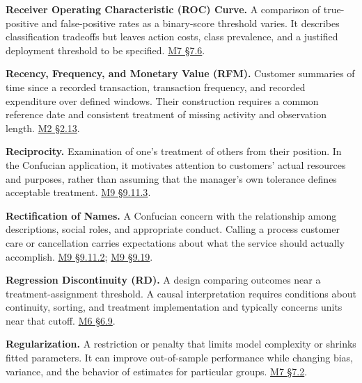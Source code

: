 \noindent\textbf{Receiver Operating Characteristic (ROC) Curve.} A comparison of
true-positive and false-positive rates as a binary-score threshold
varies. It describes classification tradeoffs but leaves action costs,
class prevalence, and a justified deployment threshold to be specified.
\href{Marketing_Analytics_Lecture_Notes.pdf\#M07-ranking-and-calibration-answer-different-questions}{M7
§7.6}.

\noindent\textbf{Recency, Frequency, and Monetary Value (RFM).} Customer
summaries of time since a recorded transaction, transaction frequency,
and recorded expenditure over defined windows. Their construction
requires a common reference date and consistent treatment of missing
activity and observation length.
\href{Marketing_Analytics_Lecture_Notes.pdf\#M02-mhealth-recency-and-frequency-at-a-fixed-date}{M2
§2.13}.

\noindent\textbf{Reciprocity.} Examination of one's treatment of others from
their position. In the Confucian application, it motivates attention to
customers' actual resources and purposes, rather than assuming that the
manager's own tolerance defines acceptable treatment.
\hyperref[M09-remonstrance-reciprocity-and-learning]{M9
§9.11.3}.

\noindent\textbf{Rectification of Names.} A Confucian concern with the
relationship among descriptions, social roles, and appropriate conduct.
Calling a process customer care or cancellation carries expectations
about what the service should actually accomplish.
\hyperref[M09-trustworthiness-and-the-responsibilities-of-a-role]{M9
§9.11.2};
\hyperref[M09-definitions-evidence-and-permission]{M9
§9.19}.

\noindent\textbf{Regression Discontinuity (RD).} A design comparing outcomes near
a treatment-assignment threshold. A causal interpretation requires
conditions about continuity, sorting, and treatment implementation and
typically concerns units near that cutoff.
\href{Marketing_Analytics_Lecture_Notes.pdf\#M06-other-designs-discontinuities-and-instruments}{M6
§6.9}.

\noindent\textbf{Regularization.} A restriction or penalty that limits model
complexity or shrinks fitted parameters. It can improve out-of-sample
performance while changing bias, variance, and the behavior of estimates
for particular groups.
\href{Marketing_Analytics_Lecture_Notes.pdf\#M07-baselines-loss-functions-and-regularization}{M7
§7.2}.

